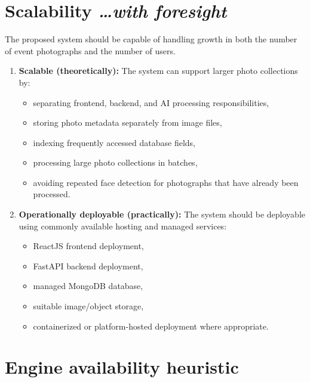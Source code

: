 \documentclass[11pt,a4paper]{article}
\newcommand{\BvrHint}[1]{%
  {\normalfont\normalsize\itshape\hfill #1}}
\begin{document}
\section{Scalability %
  \BvrHint{\ldots with foresight}}

The proposed system should be capable of handling growth in both the
number of event photographs and the number of users.

\begin{enumerate}[leftmargin=0.7cm]

    \item \textbf{Scalable (theoretically):} The system can support
    larger photo collections by:
    \begin{itemize}[leftmargin=0.7cm]
        \item separating frontend, backend, and AI processing
        responsibilities,
        \item storing photo metadata separately from image files,
        \item indexing frequently accessed database fields,
        \item processing large photo collections in batches,
        \item avoiding repeated face detection for photographs that
        have already been processed.
    \end{itemize}

    \item \textbf{Operationally deployable (practically):} The system
    should be deployable using commonly available hosting and managed
    services:
    \begin{itemize}[leftmargin=0.7cm]
        \item ReactJS frontend deployment,
        \item FastAPI backend deployment,
        \item managed MongoDB database,
        \item suitable image/object storage,
        \item containerized or platform-hosted deployment where
        appropriate.
    \end{itemize}

\end{enumerate}

\section{Engine availability heuristic}
\end{document}
